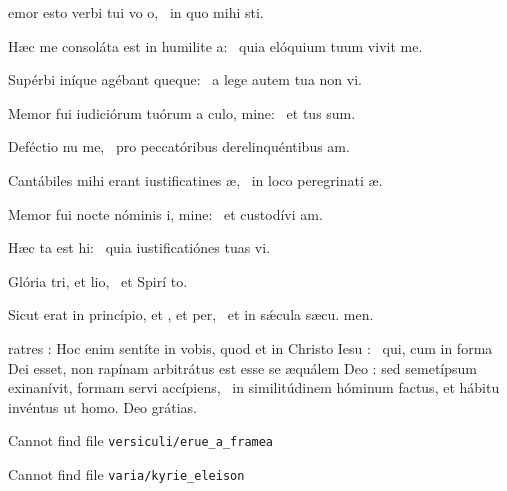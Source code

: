 \begin{psalm}
\begin{intonation}
emor esto verbi tui vo o,~{\gstella} in quo mihi  sti.
\end{intonation}
\begin{verses}
\item Hæc me consoláta est in humilite a:~{\gstella} quia elóquium tuum vivit me.
\item Supérbi iníque agébant queque:~{\gstella} a lege autem tua non vi.
\item Memor fui iudiciórum tuórum a culo, mine:~{\gstella} et tus sum.
\item Deféctio nu me,~{\gstella} pro peccatóribus derelinquéntibus  am.
\item Cantábiles mihi erant iustificatines æ,~{\gstella} in loco peregrinati æ.
\item Memor fui nocte nóminis i, mine:~{\gstella} et custodívi  am.
\item Hæc ta est hi:~{\gstella} quia iustificatiónes tuas vi.
\item Glória tri, et lio,~{\gstella} et Spirí to.
\item Sicut erat in princípio, et , et per,~{\gstella} et in sǽcula sæcu. men.
\end{verses}
\end{psalm}



\begin{lectio}ratres : Hoc enim sentíte in vobis, quod et in Christo Iesu :~{\gcrux} qui, cum in forma Dei esset, non rapínam arbitrátus est esse se æquálem Deo :
sed semetípsum exinanívit, formam servi accípiens,~{\gstella}
in similitúdinem hóminum factus, et hábitu invéntus ut homo.
\R Deo grátias.\end{lectio}

Cannot find file \verb|versiculi/erue_a_framea|

Cannot find file \verb|varia/kyrie_eleison|

